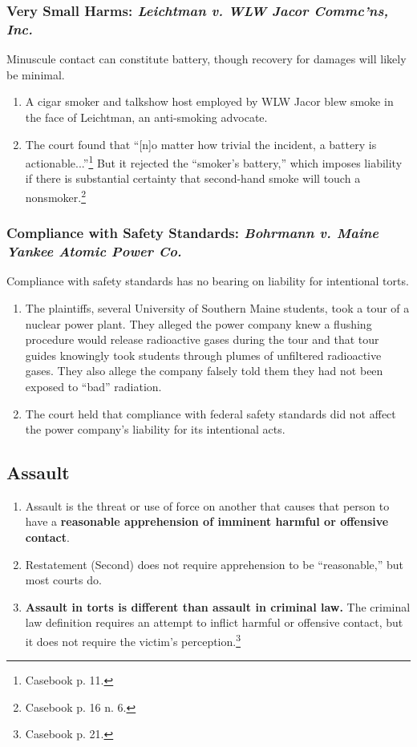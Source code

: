 \subsubsection{Very Small Harms: \emph{Leichtman v. WLW Jacor Commc'ns, Inc.}}

Minuscule contact can constitute battery, though recovery for damages will 
likely be minimal.

\begin{enumerate}
    \item A cigar smoker and talkshow host employed by WLW Jacor blew smoke in 
    the face of Leichtman, an anti-smoking advocate.
    \item The court found that ``[n]o matter how trivial the incident, a 
    battery is actionable...''\footnote{Casebook p. 11.} But it rejected the 
    ``smoker's battery,'' which imposes liability if there is substantial 
    certainty that second-hand smoke will touch a nonsmoker.\footnote{Casebook 
    p. 16 n. 6.}
\end{enumerate}

\subsubsection{Compliance with Safety Standards: \emph{Bohrmann v. Maine 
Yankee Atomic Power Co.}}

Compliance with safety standards has no bearing on liability for intentional 
torts.

\begin{enumerate}
    \item The plaintiffs, several University of Southern Maine students, took 
    a tour of a nuclear power plant. They alleged the power company knew a 
    flushing procedure would release radioactive gases during the tour and 
    that tour guides knowingly took students through plumes of unfiltered 
    radioactive gases. They also allege the company falsely told them they had 
    not been exposed to ``bad'' radiation.
    \item The court held that compliance with federal safety standards did not 
    affect the power company's liability for its intentional acts.
\end{enumerate}

\subsection{Assault}

\begin{enumerate}
    \item Assault is the threat or use of force on another that causes that 
    person to have a \textbf{reasonable apprehension of imminent harmful or 
    offensive contact}.
    \item Restatement (Second) does not require apprehension to be 
    ``reasonable,'' but most courts do.
    \item \textbf{Assault in torts is different than assault in criminal law.} 
    The criminal law definition requires an attempt to inflict harmful or 
    offensive contact, but it does not require the victim's 
    perception.\footnote{Casebook p. 21.}
\end{enumerate}

